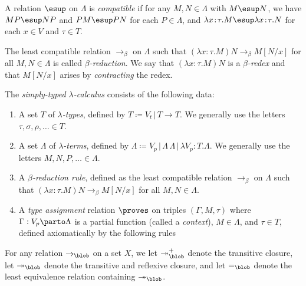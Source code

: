 \documentclass[reqno]{amsart}
\begin{document}
    \begin{definition}
        A relation $\esup$ on $\Lambda$ is \textit{compatible} if for any $M,N\in\Lambda$ with $M\esup N$, we have $MP\esup NP$ and $PM\esup PN$ for each $P\in\Lambda$, and $\lambda x\!:\!\tau.M\esup\lambda x\!:\!\tau.N$ for each $x\in V$ and $\tau\in T$.
    \end{definition}

    \begin{definition}
        The least compatible relation $\rightarrow_\beta$ on $\Lambda$ such that $(\lambda x\!:\!\tau.M)N\rightarrow_\beta M[N/x]$ for all $M,N\in\Lambda$ is called \textit{$\beta$-reduction}. We say that $(\lambda x\!:\!\tau.M)N$ is a \textit{$\beta$-redex} and that $M[N/x]$ arises by \textit{contracting} the redex.
    \end{definition}

    \begin{definition}
        The \textit{simply-typed $\lambda$-calculus} consists of the following data:
        \begin{enumerate}
            \item A set $T$ of \textit{$\lambda$-types}, defined by $T\coloneqq V_t\,|\,T\rightarrow T$. We generally use the letters $\tau,\sigma,\rho,\ldots\in T$.
            \item A set $\Lambda$ of \textit{$\lambda$-terms}, defined by $\Lambda\coloneqq V_p\,|\,\Lambda\,\Lambda\,|\,\lambda V_p\!:\!T.\Lambda$. We generally use the letters $M,N,P,\ldots\in\Lambda$.
            \item A \textit{$\beta$-reduction rule}, defined as the least compatible relation $\rightarrow_\beta$ on $\Lambda$ such that $(\lambda x\!:\!\tau.M)N\rightarrow_\beta M[N/x]$ for all $M,N\in\Lambda$.
            \item A \textit{type assignment} relation $\proves$ on triples $(\Gamma,M,\tau)$ where $\Gamma:V_p\parto\Lambda$ is a partial function (called a \textit{context}), $M\in\Lambda$, and $\tau\in T$, defined axiomatically by the following rules
        \end{enumerate}
    \end{definition}

    \begin{notation}
        For any relation $\rightarrow_\blob$ on a set $X$, we let $\twoheadrightarrow_\blob^+$ denote the transitive closure, let $\twoheadrightarrow_\blob$ denote the transitive and reflexive closure, and let $=_\blob$ denote the least equivalence relation containing $\twoheadrightarrow_\blob$.
    \end{notation}
\end{document}
